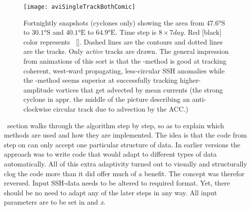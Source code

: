 \label{chap:algorithm}

\begin{fullwidth}
\begin{figure}
\texttt{[image: aviSingleTrackBothComic]}
\caption
{
Fortnightly \aviII snapshots (cyclones only) showing the area from $\ang{47.6} \mathrm{S}$ to $\ang{30.1} \mathrm{S}$ and $\ang{40.1} \mathrm{E}$ to $\ang{64.9} \mathrm{E}$. Time step is $8\times 7 \si{day}$. Red [black] color represents \MI~[\MII]. Dashed lines are the contours and dotted lines are the tracks. Only \textit{active} tracks are drawn. The general impression from animations of this sort is that the \MI-method is good at tracking coherent, west-ward propagating, less-circular SSH anomalies while the \MII-method seems superior at successfully tracking higher-amplitude vortices that get advected by mean currents (\eg the strong cyclone in appr. the middle of the picture describing an anti-clockwise circular track due to advection by the ACC.)
}
\label{fig:aviSingleTrackBothComic}
\end{figure}
\end{fullwidth}
~section walks through the algorithm step by step, so as to explain
which
methods are used and how they are implemented.
The idea is that the code from step  on can only accept one particular structure of data. In earlier versions the approach was to write code
that would adapt to different types of data automatically. All of this extra
adaptivity turned out to visually and structurally clog the code more than it
did offer much of a benefit. The concept was therefor reversed. Input SSH-data needs to be altered to required format. Yet, there should be no need to adapt any of the later steps in any way.
All input parameters are to be set in  and \textit{x}.

